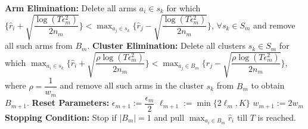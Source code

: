 \begin{algorithmic}[1]
\State \hspace*{2em} \textbf{Arm Elimination:}
\newline
\hspace*{2em} Delete all arms $a_{i}\in s_{k}$ for which
\newline\hspace*{2em}$\bigg\lbrace\hat{r}_{i} + \sqrt{\dfrac{\log{(T\epsilon_{m}^{2})}}{2 n_{m}}} \bigg\rbrace < \max_{a_{j}\in s_{k}}\bigg\lbrace\hat{r}_{j} -\sqrt{\dfrac{\log{(T\epsilon_{m}^{2})}}{2 n_{m}}} \bigg\rbrace$, $\forall s_{k}\in S_{m}$ and remove all such arms from $B_{m}$.
\State \hspace*{2em} \textbf{Cluster Elimination:}
\newline
\hspace*{2em} Delete all clusters $s_{k}\in S_{m}$ for which $\max_{a_{i}\in s_{k}}\bigg\lbrace\hat{r}_{i} + \sqrt{\dfrac{\rho\log{(T\epsilon_{m}^{2})}}{2 n_{m}}}\bigg\rbrace  $\newline\hspace*{4em}$< \max_{a_{j}\in B_{m}} \bigg\lbrace\hat{r}_{j} - \sqrt{\dfrac{\rho \log{(T\epsilon_{m}^{2})}}{2 n_{m}}}\bigg\rbrace$, where $\rho=\dfrac{1}{w_{m}}$ and remove all such arms in the cluster $s_{k}$ from $B_{m}$ to obtain $B_{m+1}$.
\State \hspace*{2em} \textbf{Reset Parameters:}
\State \hspace*{2em} $\epsilon_{m+1}:=\dfrac{\epsilon_{m}}{2}$
\State \hspace*{2em} $\ell_{m+1}:=\min\lbrace 2\ell_{m}, K\rbrace$
\State \hspace*{2em} $w_{m+1}:=2w_{m}$
\State \hspace*{2em} \textbf{Stopping Condition:} 
\newline \hspace*{2em} Stop if $|B_{m}|=1$ and pull $\max_{a_{i}\in B_{m}}\hat{r}_{i}$ till $T$ is reached.
\end{algorithmic}
